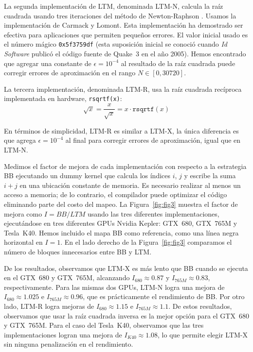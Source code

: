 \documentclass[twocolumn,10pt,a4paper]{article}
\begin{document}
La segunda implementación de LTM, denominada LTM-N, calcula la raíz cuadrada
usando tres iteraciones del método de Newton-Raphson \cite{ref18,ref15}.
Usamos la implementación de Carmack y Lomont. Esta implementación ha demostrado
ser efectiva para aplicaciones que permiten pequeños errores. El valor inicial
usado es el número mágico \texttt{0x5f3759df} (esta suposición inicial se
conoció cuando \textit{Id Software} publicó el código fuente de Quake~3 en el
año 2005). Hemos encontrado que agregar una constante de
$\epsilon = 10^{-4}$ al resultado de la raíz cuadrada puede corregir errores
de aproximación en el rango $N \in [0, 30720]$.

La tercera implementación, denominada LTM-R, usa la raíz cuadrada recíproca
implementada en hardware, \texttt{rsqrtf(x)}:
\begin{equation}
\sqrt{x} = \frac{x}{\sqrt{x}} = x \cdot \texttt{rsqrtf}(x)
\label{eq:rsqrt}
\end{equation}

En términos de simplicidad, LTM-R es similar a LTM-X, la única diferencia es
que agrega $\epsilon = 10^{-4}$ al final para corregir errores de aproximación,
igual que en LTM-N.

Medimos el factor de mejora de cada implementación con respecto a la estrategia
BB ejecutando un dummy kernel que calcula los índices $i$, $j$ y escribe la
suma $i + j$ en una ubicación constante de memoria. Es necesario realizar al
menos un acceso a memoria; de lo contrario, el compilador puede optimizar el
código eliminando parte del costo del mapeo. La Figura~\ref{fig:fig3} muestra
el factor de mejora como $I = BB/LTM$ usando las tres diferentes
implementaciones, ejecutándose en tres diferentes GPUs Nvidia Kepler: GTX~680,
GTX~765M y Tesla~K40. Hemos incluido el mapa BB como referencia, como una
línea negra horizontal en $I = 1$. En el lado derecho de la
Figura~\ref{fig:fig3} comparamos el número de bloques innecesarios entre BB
y LTM.

De los resultados, observamos que LTM-X es más lento que BB cuando se ejecuta
en el GTX~680 y GTX~765M, alcanzando $I_{680} \approx 0.87$ y
$I_{765M} \approx 0.83$, respectivamente. Para las mismas dos GPUs, LTM-N
logra una mejora de $I_{680} \approx 1.025$ e $I_{765M} \approx 0.96$, que
es prácticamente el rendimiento de BB. Por otro lado, LTM-R logra mejoras de
$I_{680} \approx 1.15$ e $I_{765M} \approx 1.1$. De estos resultados,
observamos que usar la raíz cuadrada inversa es la mejor opción para el
GTX~680 y GTX~765M. Para el caso del Tesla~K40, observamos que las tres
implementaciones logran una mejora de $I_{K40} \approx 1.08$, lo que permite
elegir LTM-X sin ninguna penalización en el rendimiento.
\end{document}
